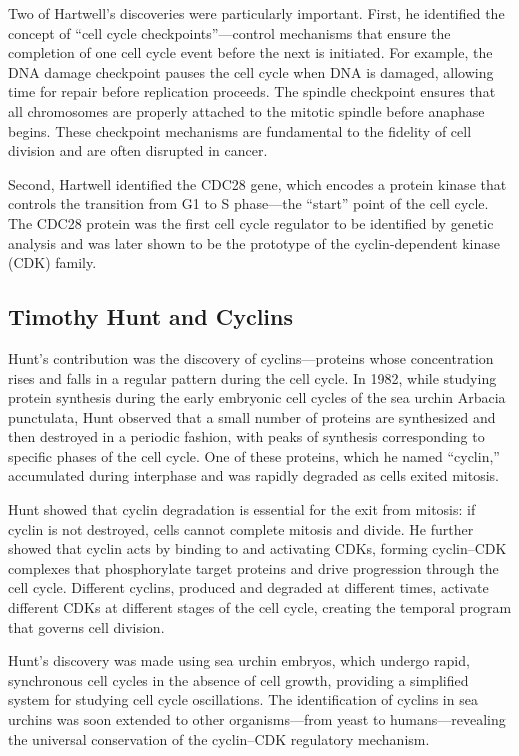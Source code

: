 Two of Hartwell's discoveries were particularly important. First, he identified the concept of ``cell cycle checkpoints''---control mechanisms that ensure the completion of one cell cycle event before the next is initiated. For example, the DNA damage checkpoint pauses the cell cycle when DNA is damaged, allowing time for repair before replication proceeds. The spindle checkpoint ensures that all chromosomes are properly attached to the mitotic spindle before anaphase begins. These checkpoint mechanisms are fundamental to the fidelity of cell division and are often disrupted in cancer.

Second, Hartwell identified the CDC28 gene, which encodes a protein kinase that controls the transition from G1 to S phase---the ``start'' point of the cell cycle. The CDC28 protein was the first cell cycle regulator to be identified by genetic analysis and was later shown to be the prototype of the cyclin-dependent kinase (CDK) family.

\subsection{Timothy Hunt and Cyclins}

Hunt's contribution was the discovery of cyclins---proteins whose concentration rises and falls in a regular pattern during the cell cycle. In 1982, while studying protein synthesis during the early embryonic cell cycles of the sea urchin Arbacia punctulata, Hunt observed that a small number of proteins are synthesized and then destroyed in a periodic fashion, with peaks of synthesis corresponding to specific phases of the cell cycle. One of these proteins, which he named ``cyclin,'' accumulated during interphase and was rapidly degraded as cells exited mitosis.

Hunt showed that cyclin degradation is essential for the exit from mitosis: if cyclin is not destroyed, cells cannot complete mitosis and divide. He further showed that cyclin acts by binding to and activating CDKs, forming cyclin--CDK complexes that phosphorylate target proteins and drive progression through the cell cycle. Different cyclins, produced and degraded at different times, activate different CDKs at different stages of the cell cycle, creating the temporal program that governs cell division.

Hunt's discovery was made using sea urchin embryos, which undergo rapid, synchronous cell cycles in the absence of cell growth, providing a simplified system for studying cell cycle oscillations. The identification of cyclins in sea urchins was soon extended to other organisms---from yeast to humans---revealing the universal conservation of the cyclin--CDK regulatory mechanism.

